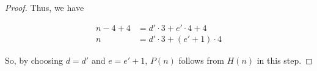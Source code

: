 \documentclass[12pt]{article}
\begin{document}
\begin{itemize}
\begin{proof}
    Thus, we have

    \begin{align}
        n-4+4 &= d' \cdot 3 + e' \cdot 4 + 4\\
        n &= d' \cdot 3 + (e'+1) \cdot 4
    \end{align}

    \bigskip

    So, by choosing $d = d'$ and $e = e' + 1$, $P(n)$ follows from $H(n)$ in this step.

    \end{proof}

    \bigskip



















\end{itemize}
\end{document}
